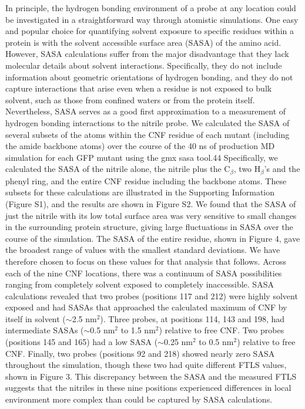 In principle, the hydrogen bonding environment of a probe at any location could be investigated in a straightforward way through atomistic simulations.
One easy and popular choice for quantifying solvent exposure to specific residues within a protein is with the solvent accessible surface area (SASA) of the amino acid.
However, SASA calculations suffer from the major disadvantage that they lack molecular details about solvent interactions.
Specifically, they do not include information about geometric orientations of hydrogen bonding, and they do not capture interactions that arise even when a residue is not exposed to bulk solvent, such as those from confined waters or from the protein itself.
Nevertheless, SASA serves as a good first approximation to a measurement of hydrogen bonding interactions to the nitrile probe.  
We calculated the SASA of several subsets of the atoms within the CNF residue of each mutant (including the amide backbone atoms) over the course of the 40 ns of production MD simulation for each GFP mutant using the gmx sasa tool.44
Specifically, we calculated the SASA of the nitrile alone, the nitrile plus the C$_{\beta}$, two H$_{\beta}$'s and the phenyl ring, and the entire CNF residue including the backbone atoms.
These subsets for these calculations are illustrated in the Supporting Information (Figure S1), and the results are shown in Figure S2.
We found that the SASA of just the nitrile with its low total surface area was very sensitive to small changes in the surrounding protein structure, giving large fluctuations in SASA over the course of the simulation.
The SASA of the entire residue, shown in Figure 4, gave the broadest range of values with the smallest standard deviations.
We have therefore chosen to focus on these values for that analysis that follows.
Across each of the nine CNF locations, there was a continuum of SASA possibilities ranging from completely solvent exposed to completely inaccessible.
SASA calculations revealed that two probes (positions 117 and 212) were highly solvent exposed and had SASAs that approached the calculated maximum of CNF by itself in solvent ($\sim$2.5 nm$^2$).
Three probes, at positions 114, 143 and 198, had intermediate SASAs ($\sim$0.5 nm$^2$ to 1.5 nm$^2$) relative to free CNF.
Two probes (positions 145 and 165) had a low SASA ($\sim$0.25 nm$^2$ to 0.5 nm$^2$) relative to free CNF.
Finally, two probes (positions 92 and 218) showed nearly zero SASA throughout the simulation, though these two had quite different FTLS values, shown in Figure 3.
This discrepancy between the SASA and the measured FTLS suggests that the nitriles in these nine positions experienced differences in local environment more complex than could be captured by SASA calculations.

